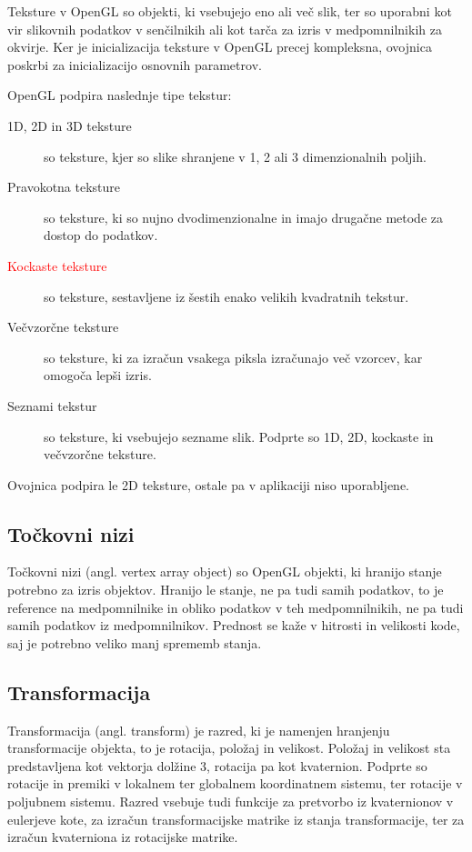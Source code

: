 \documentclass[a4paper, 12pt]{book}
\begin{document}
Teksture v OpenGL so objekti, ki vsebujejo eno ali več slik, ter so uporabni kot vir slikovnih podatkov v senčilnikih ali kot tarča za izris v medpomnilnikih za okvirje. Ker je inicializacija teksture v OpenGL precej kompleksna, ovojnica poskrbi za inicializacijo osnovnih parametrov.

OpenGL podpira naslednje tipe tekstur:

\begin{description}
\item [1D, 2D in 3D teksture]so teksture, kjer so slike shranjene v 1, 2 ali 3 dimenzionalnih poljih.
\item [Pravokotna teksture]so teksture, ki so nujno dvodimenzionalne in imajo drugačne metode za dostop do podatkov.
\item [\textcolor{red}{Kockaste teksture}]so teksture, sestavljene iz šestih enako velikih kvadratnih tekstur.
\item [Večvzorčne teksture]so teksture, ki za izračun vsakega piksla izračunajo več vzorcev, kar omogoča lepši izris.
\item [Seznami tekstur]so teksture, ki vsebujejo sezname slik. Podprte so 1D, 2D, kockaste in večvzorčne teksture.
\end{description}

Ovojnica podpira le 2D teksture, ostale pa v aplikaciji niso uporabljene.

\subsection*{Točkovni nizi}

Točkovni nizi (angl. vertex array object) so OpenGL objekti, ki hranijo stanje potrebno za izris objektov. Hranijo le stanje, ne pa tudi samih podatkov, to je reference na medpomnilnike in obliko podatkov v teh medpomnilnikih, ne pa tudi samih podatkov iz medpomnilnikov. Prednost se kaže v hitrosti in velikosti kode, saj je potrebno veliko manj sprememb stanja.

\subsection*{Transformacija}

Transformacija (angl. transform) je razred, ki je namenjen hranjenju transformacije objekta, to je rotacija, položaj in velikost. Položaj in velikost sta predstavljena kot vektorja dolžine 3, rotacija pa kot kvaternion\cite{quaternion}. Podprte so rotacije in premiki v lokalnem ter globalnem koordinatnem sistemu, ter rotacije v poljubnem sistemu. Razred vsebuje tudi funkcije za pretvorbo iz kvaternionov v eulerjeve kote, za izračun transformacijske matrike iz stanja transformacije, ter za izračun kvaterniona iz rotacijske matrike.
\end{document}
